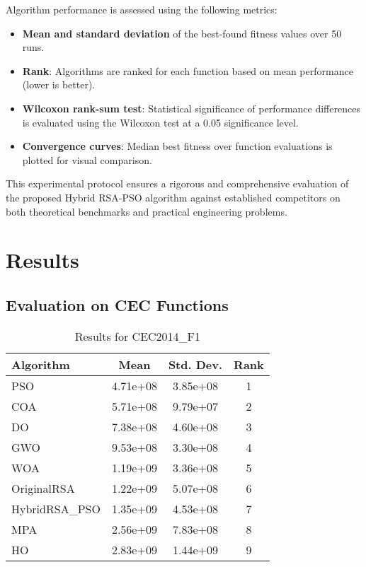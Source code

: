 \documentclass[12pt]{article}
\begin{document}
Algorithm performance is assessed using the following metrics:
\begin{itemize}
    \item \textbf{Mean and standard deviation} of the best-found fitness values over 50 runs.
    \item \textbf{Rank}: Algorithms are ranked for each function based on mean performance (lower is better).
    \item \textbf{Wilcoxon rank-sum test}: Statistical significance of performance differences is evaluated using the Wilcoxon test at a 0.05 significance level.
    \item \textbf{Convergence curves}: Median best fitness over function evaluations is plotted for visual comparison.
\end{itemize}

This experimental protocol ensures a rigorous and comprehensive evaluation of the proposed Hybrid RSA-PSO algorithm against established competitors on both theoretical benchmarks and practical engineering problems.



\section{Results}

\subsection{Evaluation on CEC Functions}

\begin{table}[H]
\centering
\caption{Results for CEC2014\_F1}
\begin{tabular}{|l|c|c|c|}
\hline
\textbf{Algorithm} & \textbf{Mean} & \textbf{Std. Dev.} & \textbf{Rank} \\
\hline
PSO & 4.71e+08 & 3.85e+08 & 1 \\
COA & 5.71e+08 & 9.79e+07 & 2 \\
DO & 7.38e+08 & 4.60e+08 & 3 \\
GWO & 9.53e+08 & 3.30e+08 & 4 \\
WOA & 1.19e+09 & 3.36e+08 & 5 \\
OriginalRSA & 1.22e+09 & 5.07e+08 & 6 \\
HybridRSA\_PSO & 1.35e+09 & 4.53e+08 & 7 \\
MPA & 2.56e+09 & 7.83e+08 & 8 \\
HO & 2.83e+09 & 1.44e+09 & 9 \\
\hline
\end{tabular}
\end{table}
\end{document}
